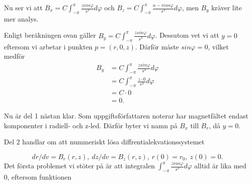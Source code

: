 \documentclass[a4paper]{article}
\begin{document}
Nu ser vi att $B_x = C\int_{-\pi}^\pi \frac{zcos\varphi}{s^3}d\varphi$ och $B_z
= C\int_{-\pi}^\pi \frac{a - rcos\varphi}{s^3}d\varphi $, men $B_y$ kräver lite mer analys.

\vspace{1pc}

Enligt beräkningen ovan gäller $B_y = C\int_{-\pi}^\pi
\frac{zsin\varphi}{s^3}d\varphi$. Dessutom vet vi att $y = 0$ eftersom vi
arbetar i punkten $p = (r, 0, z)$. Därför måste $sin\varphi = 0$, vilket medför
\begin{eqnarray*}
  B_y & = C\int_{-\pi}^\pi \frac{zsin\varphi}{s^3}d\varphi \\
      & = C\int_{-\pi}^\pi \frac{z \cdot 0}{s^3}d\varphi \\
      & = C \cdot 0 \\
      & = 0.
\end{eqnarray*}

Nu är del 1 nästan klar. Som uppgiftsförfattaren noterar har magnetfältet endast
komponenter i radiell- och z-led. Därför byter vi namn på $B_x$ till $B_r$, då
$y = 0$.

\vspace{1pc}

Del 2 handlar om att nummeriskt lösa diffrentialekvationssystemet 

$$
dr/dv = B_r(r,z),\ dz/dv = B_z(r, z),\ r(0) = r_0,\ z(0) = 0.
$$
Det första problemet vi stöter på är att integralen $\int_{-\pi}^\pi
\frac{zcos\varphi}{s^3}d\varphi$ alltid är lika med 0, eftersom funktionen 
\end{document}
